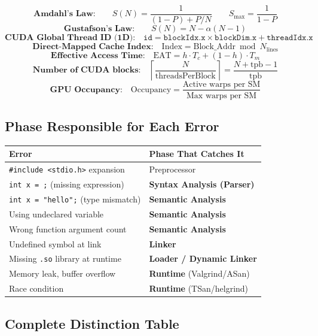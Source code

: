 \documentclass[11pt,a4paper]{article}
\newcommand{\code}[1]{\texttt{\small\colorbox{codebg}{\color{codekw}#1}}}
\begin{document}
\begin{tcolorbox}[enhanced, breakable, colback=lightblue, colframe=darkblue, boxrule=2pt, arc=6pt]
\[
\textbf{Amdahl's Law:} \qquad S(N) = \frac{1}{(1-P) + P/N} \qquad S_{\max} = \frac{1}{1-P}
\]
\[
\textbf{Gustafson's Law:} \qquad S(N) = N - \alpha(N-1)
\]
\[
\textbf{CUDA Global Thread ID (1D):} \quad \texttt{id} = \texttt{blockIdx.x} \times \texttt{blockDim.x} + \texttt{threadIdx.x}
\]
\[
\textbf{Direct-Mapped Cache Index:} \quad \text{Index} = \text{Block\_Addr} \bmod N_{\text{lines}}
\]
\[
\textbf{Effective Access Time:} \quad \text{EAT} = h \cdot T_c + (1-h) \cdot T_m
\]
\[
\textbf{Number of CUDA blocks:} \quad \left\lceil \frac{N}{\text{threadsPerBlock}} \right\rceil = \frac{N + \text{tpb} - 1}{\text{tpb}}
\]
\[
\textbf{GPU Occupancy:} \quad \text{Occupancy} = \frac{\text{Active warps per SM}}{\text{Max warps per SM}}
\]
\end{tcolorbox}

\subsection{Phase Responsible for Each Error}

\begin{center}
\begin{tabular}{L{6cm} L{7.5cm}}
\toprule
\textbf{Error} & \textbf{Phase That Catches It} \\
\midrule
\code{\#include <stdio.h>} expansion & Preprocessor \\
\code{int x = ;} (missing expression) & \textbf{Syntax Analysis (Parser)} \\
\code{int x = "hello";} (type mismatch) & \textbf{Semantic Analysis} \\
Using undeclared variable & \textbf{Semantic Analysis} \\
Wrong function argument count & \textbf{Semantic Analysis} \\
Undefined symbol at link & \textbf{Linker} \\
Missing \code{.so} library at runtime & \textbf{Loader / Dynamic Linker} \\
Memory leak, buffer overflow & \textbf{Runtime} (Valgrind/ASan) \\
Race condition & \textbf{Runtime} (TSan/helgrind) \\
\bottomrule
\end{tabular}
\end{center}

\subsection{Complete Distinction Table}
\end{document}
